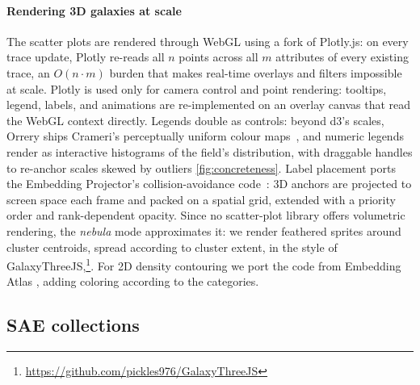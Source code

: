 \documentclass[11pt]{article}
\begin{document}
\paragraph{Rendering 3D galaxies at scale}


The scatter plots are rendered through WebGL using a fork of Plotly.js: on every trace update, Plotly re-reads all $n$ points across all $m$ attributes of every existing trace, an $O(n \cdot m)$ burden that makes real-time overlays and filters impossible at scale. Plotly is used only for camera control and point rendering: tooltips, legend, labels, and animations are re-implemented on an overlay canvas that read the WebGL context directly. Legends double as controls: beyond d3's scales, Orrery ships Crameri's perceptually uniform colour maps~\cite{crameri2018scientific, crameri2020misuse}, and numeric legends render as interactive histograms of the field's distribution, with draggable handles to re-anchor scales skewed by outliers \ref{fig:concreteness}.  Label placement ports the Embedding Projector's collision-avoidance code~\cite{smilkov2016embeddingprojectorinteractivevisualization}: 3D anchors are projected to screen space each frame and packed on a spatial grid, extended with a priority order and rank-dependent opacity. Since no scatter-plot library offers volumetric rendering, the \emph{nebula} mode approximates it: we render feathered sprites around cluster centroids, spread according to cluster extent, in the style of GalaxyThreeJS,\footnote{\url{https://github.com/pickles976/GalaxyThreeJS}}. 
For 2D density contouring we port the code from Embedding Atlas \cite{ren2025embeddingatlaslowfrictioninteractive}, adding coloring according to the categories. 







\subsection{SAE collections}
\label{sec:sae}
\end{document}
